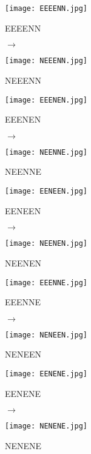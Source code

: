 \begin{figure}[!htb]
\centering
\begin{minipage}[t]{0.3\textwidth}
\centering
\texttt{[image: EEEENN.jpg]}
\caption*{EEEENN}
\end{minipage}
$\to$
\begin{minipage}[t]{0.3\textwidth}
\centering
\texttt{[image: NEEENN.jpg]}
\caption*{NEEENN}
\end{minipage}
\end{figure}

\begin{figure}[!htb]
\centering
\begin{minipage}[t]{0.3\textwidth}
\centering
\texttt{[image: EEENEN.jpg]}
\caption*{EEENEN}
\end{minipage}
$\to$
\begin{minipage}[t]{0.3\textwidth}
\centering
\texttt{[image: NEENNE.jpg]}
\caption*{NEENNE}
\end{minipage}
\end{figure}

\begin{figure}[!htb]
\centering
\begin{minipage}[t]{0.3\textwidth}
\centering
\texttt{[image: EENEEN.jpg]}
\caption*{EENEEN}
\end{minipage}
$\to$
\begin{minipage}[t]{0.3\textwidth}
\centering
\texttt{[image: NEENEN.jpg]}
\caption*{NEENEN}
\end{minipage}
\end{figure}

\begin{figure}[!htb]
\centering
\begin{minipage}[t]{0.3\textwidth}
\centering
\texttt{[image: EEENNE.jpg]}
\caption*{EEENNE}
\end{minipage}
$\to$
\begin{minipage}[t]{0.3\textwidth}
\centering
\texttt{[image: NENEEN.jpg]}
\caption*{NENEEN}
\end{minipage}
\end{figure}

\begin{figure}[!htb]
\centering
\begin{minipage}[t]{0.3\textwidth}
\centering
\texttt{[image: EENENE.jpg]}
\caption*{EENENE}
\end{minipage}
$\to$
\begin{minipage}[t]{0.3\textwidth}
\centering
\texttt{[image: NENENE.jpg]}
\caption*{NENENE}
\end{minipage}
\end{figure}
